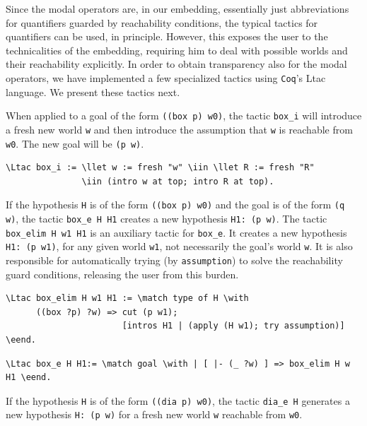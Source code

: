 \documentclass{llncs}
\newcommand{\red}[1]{\textcolor[rgb]{1,0,0}{#1}}
\newcommand{\blue}[1]{\textcolor[rgb]{0,0,1}{#1}}
\newcommand{\Ltac}{\red{Ltac}}
\newcommand{\llet}{\blue{let}}
\newcommand{\match}{\blue{match}}
\newcommand{\with}{\blue{with}}
\newcommand{\eend}{\blue{end}}
\newcommand{\iin}{\blue{in}}
\newcommand{\Coq}{\texttt{Coq}\xspace}
\begin{document}
Since the modal operators are, in our embedding, essentially just
abbreviations for quantifiers guarded by reachability conditions, the
typical tactics for quantifiers can be used, in principle.  However,
this exposes the user to the technicalities of the embedding,
requiring him to deal with possible worlds and their reachability
explicitly. In order to obtain transparency also for the modal
operators, we have implemented a few specialized tactics using \Coq's
Ltac language. We present these tactics next.

When applied to a goal of the form \texttt{((box p) w0)}, the tactic
\texttt{box\_i} will introduce a fresh new world \texttt{w} and then
introduce the assumption that \texttt{w} is reachable from
\texttt{w0}. The new goal will be \texttt{(p w)}.

\begin{Verbatim}[commandchars=\\\{\},fontsize=\verbsize]
\Ltac box_i := \llet w := fresh "w" \iin \llet R := fresh "R" 
               \iin (intro w at top; intro R at top).
\end{Verbatim}

\noindent 
If the hypothesis \texttt{H} is of the form \texttt{((box p)
w0)} and the goal is of the form \texttt{(q w)}, the tactic
\texttt{box\_e H H1} creates a new hypothesis \texttt{H1: (p w)}. The
tactic \texttt{box\_elim H w1 H1} is an auxiliary tactic for
\texttt{box\_e}. It creates a new hypothesis \texttt{H1: (p w1)}, for
any given world \texttt{w1}, not necessarily the goal's world
\texttt{w}. It is also responsible for automatically trying (by
\texttt{assumption}) to solve the reachability guard conditions,
releasing the user from this burden.

\begin{Verbatim}[commandchars=\\\{\},fontsize=\verbsize]
\Ltac box_elim H w1 H1 := \match type of H \with 
      ((box ?p) ?w) => cut (p w1); 
                       [intros H1 | (apply (H w1); try assumption)] \eend.
\end{Verbatim}

\begin{Verbatim}[commandchars=\\\{\},fontsize=\verbsize]
\Ltac box_e H H1:= \match goal \with | [ |- (_ ?w) ] => box_elim H w H1 \eend.
\end{Verbatim}

\noindent 
If the hypothesis \texttt{H} is of the form \texttt{((dia p)
w0)}, the tactic \texttt{dia\_e H} generates a new hypothesis
\texttt{H: (p w)} for a fresh new world \texttt{w} reachable from
\texttt{w0}.
\end{document}
